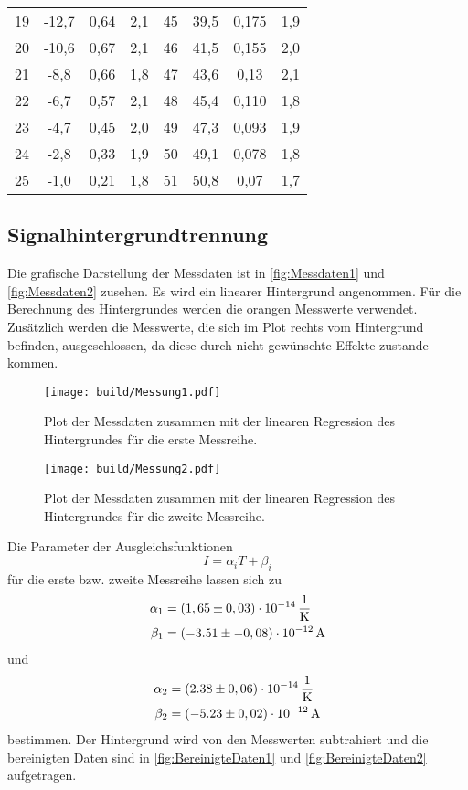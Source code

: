 \begin{table}[H]
\begin{tabular}{c c c c c c c c}
        19  &-12,7   &0,64    & 2,1&45  &39,5   & 0,175 & 1,9 \\
        20  &-10,6   &0,67    & 2,1&46  &41,5   & 0,155 & 2,0 \\
        21  &-8,8    &0,66    & 1,8&47  &43,6   & 0,13  & 2,1\\
        22  &-6,7    &0,57    & 2,1&48  &45,4   & 0,110 & 1,8 \\
        23  &-4,7    &0,45    & 2,0&49  &47,3   & 0,093 & 1,9 \\
        24  &-2,8    &0,33    & 1,9&50  &49,1   & 0,078 & 1,8 \\
        25  &-1,0    &0,21    & 1,8&51  &50,8   & 0,07  & 1,7\\
        \bottomrule
        \end{tabular}
        \end{table}
  
  

\subsection{Signalhintergrundtrennung}
\label{sec:Signalhintergrundtrennung}
        
Die grafische Darstellung der Messdaten ist in \autoref{fig:Messdaten1} und \autoref{fig:Messdaten2} zusehen.
Es wird ein linearer Hintergrund angenommen. Für die Berechnung des Hintergrundes werden die orangen Messwerte verwendet.
Zusätzlich werden die Messwerte, die sich im Plot rechts vom Hintergrund befinden, ausgeschlossen, da diese durch nicht gewünschte Effekte zustande kommen. 
\begin{figure}[H]
    \centering
    \texttt{[image: build/Messung1.pdf]}
    \caption{Plot der Messdaten zusammen mit der linearen Regression des Hintergrundes für die erste Messreihe.}
    \label{fig:Messdaten1}
\end{figure}
\begin{figure}[H]
    \centering
    \texttt{[image: build/Messung2.pdf]}
    \caption{Plot der Messdaten zusammen mit der linearen Regression des Hintergrundes für die zweite Messreihe.}
    \label{fig:Messdaten2}
\end{figure}
Die Parameter der Ausgleichsfunktionen
\begin{equation*}
    I = \alpha_i T + \beta_i
\end{equation*}
für die erste bzw. zweite Messreihe lassen sich zu 
\begin{align*}
    \alpha_1 &=         (1,65 \pm 0,03 ) \cdot 10^{-14} \,\unit{\dfrac{1}{\kelvin}} \\
    \beta_1  &=         (-3.51 \pm-0,08) \cdot 10^{-12} \,\unit{\ampere} 
\end{align*}
und 
\begin{align*}
    \alpha_2 &=         ( 2.38 \pm 0,06 ) \cdot 10^{-14}  \,\unit{\dfrac{1}{\kelvin}} \\
    \beta_2  &=         (-5.23 \pm 0,02 ) \cdot 10^{-12} \,\unit{\ampere} 
\end{align*}
bestimmen.
Der Hintergrund wird von den Messwerten subtrahiert und die bereinigten Daten sind in 
\autoref{fig:BereinigteDaten1} und \autoref{fig:BereinigteDaten2} aufgetragen.

